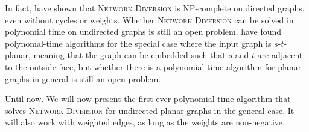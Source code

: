 In fact, \cite{source:theoretical-and-computational-advances-for-network-diversion} have shown that \textsc{Network Diversion} is NP-complete on directed graphs, even without cycles or weights. Whether \textsc{Network Diversion} can be solved in polynomial time on undirected graphs is still an open problem. \cite{source:theoretical-and-computational-advances-for-network-diversion} have found polynomal-time algorithms for the special case where the input graph is $s$-$t$-planar, meaning that the graph can be embedded such that $s$ and $t$ are adjacent to the outside face, but whether there is a polynomial-time algorithm for planar graphs in general is still an open problem.

Until now. We will now present the first-ever polynomial-time algorithm that solves \textsc{Network Diversion} for undirected planar graphs in the general case. It will also work with weighted edges, as long as the weights are non-negative.
